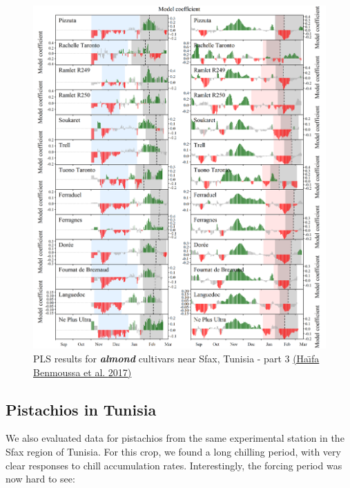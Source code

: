 \documentclass[
]{book}
\begin{document}
\begin{figure}
\centering
\includegraphics{pictures/PLS_chill_force_almonds3_Tunisia.png}
\caption{PLS results for \textbf{\emph{almond}} cultivars near Sfax, Tunisia - part 3 \href{https://www.sciencedirect.com/science/article/abs/pii/S0168192317300734}{(Haı̈fa Benmoussa et al. \protect\hyperlink{ref-benmoussa2017chilling}{2017})}}
\end{figure}

\hypertarget{pistachios-in-tunisia}{%
\subsection{Pistachios in Tunisia}\label{pistachios-in-tunisia}}

We also evaluated data for pistachios from the same experimental station in the Sfax region of Tunisia. For this crop, we found a long chilling period, with very clear responses to chill accumulation rates. Interestingly, the forcing period was now hard to see:
\end{document}
